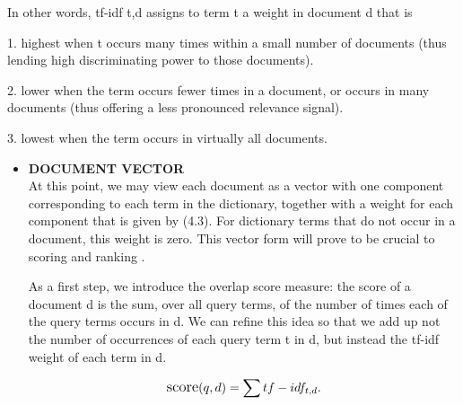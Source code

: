 In other words, tf-idf t,d assigns to term t a weight in document d that is

1. highest when t occurs many times within a small number of documents
(thus lending high discriminating power to those documents).

2. lower when the term occurs fewer times in a document, or occurs in many
documents (thus offering a less pronounced relevance signal).

3. lowest when the term occurs in virtually all documents.     

\begin{itemize}
     \item \textbf{DOCUMENT VECTOR}\\
   At this point, we may view each document as a vector with one component
   corresponding to each term in the dictionary, together with a weight for each
   component that is given by (4.3). For dictionary terms that do not occur in
   a document, this weight is zero. This vector form will prove to be crucial to
   scoring and ranking .

   As a first step, we introduce the overlap score measure: the score of a document d is the sum, over all query terms, of the number of times each of the query terms occurs in d. We can refine this idea so that we add up not the number of occurrences of each query term t in d, but instead the tf-idf weight of each term in d.
   
   \begin{equation}
        \large
         \text{score}(q,d) =\sum tf-idf_{t,d}. \end{equation}
\end{itemize}
 
 


